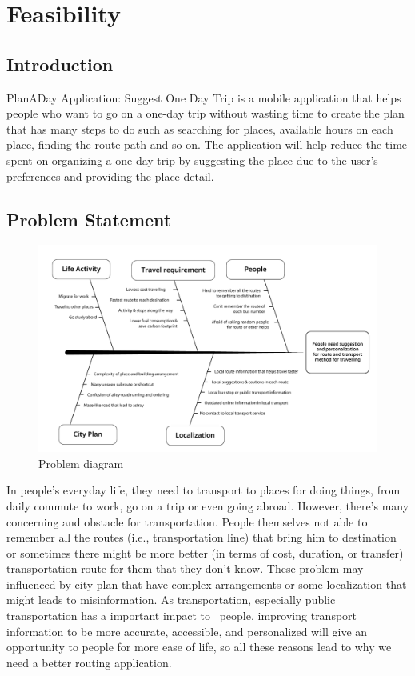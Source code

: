 \chapter{Feasibility}
\section{Introduction}

\par
PlanADay Application: Suggest One Day Trip is a mobile application that helps people who want to go on a one-day trip without wasting time to create the plan that has many steps to do such as searching for places, available hours on each place, finding the route path and so on. The application will help reduce the time spent on organizing a one-day trip by suggesting the place due to the user’s preferences and providing the place detail.
\section{Problem Statement}
\begin{figure}[!h]
    \centering
    \includegraphics[width=0.8\linewidth]{chapter2/problem-statement.png}
    \caption{Problem diagram}    
    \label{fig:Problem diagram}
\end{figure}
\par
In people's everyday life, they need to transport to places for doing things, from daily commute to work, go on a trip or even going abroad. However, there's many concerning and obstacle for transportation. People themselves not able to remember all the routes (i.e., transportation line) that bring him to destination or sometimes there might be more better (in terms of cost, duration, or transfer) transportation route for them that they don't know. These problem may influenced by city plan that have complex arrangements or some localization that might leads to misinformation. As transportation, especially public transportation has a important impact to  people, improving transport information to be more accurate, accessible, and personalized will give an opportunity to people for more ease of life, so all these reasons lead to why we need a better routing application.

